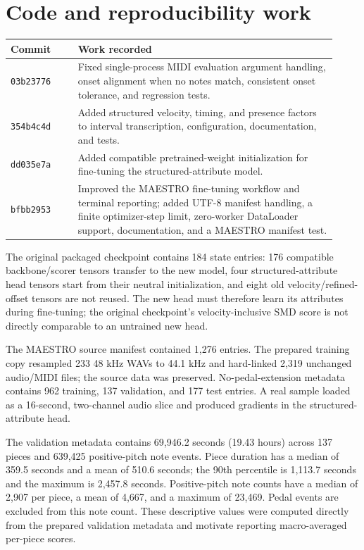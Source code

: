 \documentclass[11pt]{article}
\begin{document}
\section{Code and reproducibility work}

\begin{longtable}{p{0.19\linewidth}p{0.73\linewidth}}
\toprule
\textbf{Commit} & \textbf{Work recorded} \\
\midrule
\endhead
\texttt{03b23776} &
Fixed single-process MIDI evaluation argument handling, onset alignment
when no notes match, consistent onset tolerance, and regression tests. \\
\texttt{354b4c4d} &
Added structured velocity, timing, and presence factors to interval
transcription, configuration, documentation, and tests. \\
\texttt{dd035e7a} &
Added compatible pretrained-weight initialization for fine-tuning the
structured-attribute model. \\
\texttt{bfbb2953} &
Improved the MAESTRO fine-tuning workflow and terminal reporting; added
UTF-8 manifest handling, a finite optimizer-step limit, zero-worker
DataLoader support, documentation, and a MAESTRO manifest test. \\
\bottomrule
\end{longtable}

The original packaged checkpoint contains 184 state entries: 176 compatible
backbone/scorer tensors transfer to the new model, four structured-attribute
head tensors start from their neutral initialization, and eight old
velocity/refined-offset tensors are not reused. The new head must therefore
learn its attributes during fine-tuning; the original checkpoint's
velocity-inclusive SMD score is not directly comparable to an untrained new
head.

The MAESTRO source manifest contained 1,276 entries. The prepared training
copy resampled 233 48 kHz WAVs to 44.1 kHz and hard-linked 2,319 unchanged
audio/MIDI files; the source data was preserved. No-pedal-extension metadata
contains 962 training, 137 validation, and 177 test entries. A real sample
loaded as a 16-second, two-channel audio slice and produced gradients in the
structured-attribute head.

The validation metadata contains 69,946.2 seconds (19.43 hours) across 137
pieces and 639,425 positive-pitch note events. Piece duration has a median
of 359.5 seconds and a mean of 510.6 seconds; the 90th percentile is
1,113.7 seconds and the maximum is 2,457.8 seconds. Positive-pitch note
counts have a median of 2,907 per piece, a mean of 4,667, and a maximum of
23,469. Pedal events are excluded from this note count. These descriptive
values were computed directly from the prepared validation metadata and
motivate reporting macro-averaged per-piece scores.
\end{document}
